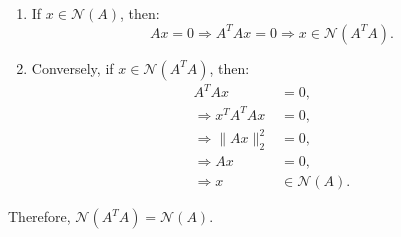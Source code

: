 \begin{derivation}
    
    \begin{enumerate}
        \item If \( x \in \mathcal{N}(A) \), then:
        \[
        A x = 0 \Rightarrow A^T A x = 0 \Rightarrow x \in \mathcal{N}(A^T A).
        \]
     
        \item Conversely, if \( x \in \mathcal{N}(A^T A) \), then:
        \begin{align*}
            A^T A x &= 0, \\
            \Rightarrow x^T A^T A x &= 0, \\
            \Rightarrow \| A x \|_2^2 &= 0, \\
            \Rightarrow A x &= 0, \\
            \Rightarrow x &\in \mathcal{N}(A).
        \end{align*}
    \end{enumerate}
    
    Therefore, \( \mathcal{N}(A^T A) = \mathcal{N}(A) \).
\end{derivation}

